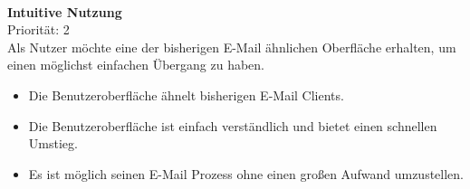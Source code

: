 \noindent
\\ \textbf{Intuitive Nutzung} \\
Priorität: 2 \\
Als Nutzer möchte eine der bisherigen E-Mail ähnlichen Oberfläche erhalten, um einen möglichst einfachen Übergang zu haben.
\begin{itemize}
    \item Die Benutzeroberfläche ähnelt bisherigen E-Mail Clients.
    \item Die Benutzeroberfläche ist einfach verständlich und bietet einen schnellen Umstieg.
    \item Es ist möglich seinen E-Mail Prozess ohne einen großen Aufwand umzustellen.
\end{itemize}